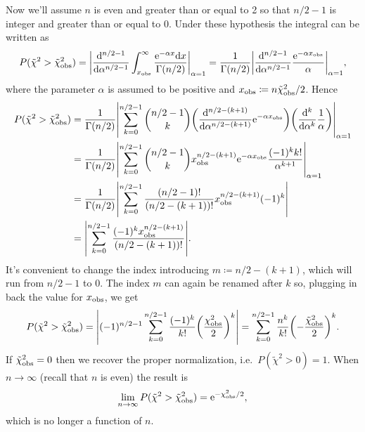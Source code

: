 \documentclass[
	10pt,
	draft
]{scrreprt}
\newcommand{\eu}{\ensuremath{\mathrm{e}}}
\newcommand{\deriv}[3][]{\dfrac{\ud^{#1}#2}{\ud #3^{#1}}}%
\begin{document}
Now we'll assume $n$ is even and greater than or equal to \num{2} so that $n/2-1$ is integer and greater than or equal to \num{0}.
Under these hypothesis the integral can be written as
\begin{equation*}
P(\tilde\chi^2>\tilde\chi^2_\textup{obs})  =
\abs*{\deriv[n/2-1]{}{\alpha}\int_{x_\textup{obs}}^\infty\frac{\eu^{-\alpha x} \!\ud x}{\Gamma(n/2)}}_{\alpha=1}
= \frac{1}{\Gamma(n/2)}\abs*{\deriv[n/2-1]{}{\alpha}\frac{\eu^{-\alpha x_\textup{obs}}}{\alpha}}_{\alpha=1},
\end{equation*}
where the parameter $\alpha$ is assumed to be positive and $x_\textup{obs} \coloneqq n\tilde \chi^2_\textup{obs}/2$.
Hence
\begin{equation*}
\begin{aligned}
P(\tilde\chi^2>\tilde\chi^2_\textup{obs})
&= \frac{1}{\Gamma(n/2)}
\abs*{\sum_{k=0}^{n/2-1}{n/2-1 \choose k}
\tp*{\deriv[n/2-(k+1)]{}{\alpha}\eu^{-\alpha x_\textup{obs}}}
\tp*{\deriv[k]{}{\alpha}\frac{1}{\alpha}}
}_{\alpha=1}\\
&= \frac{1}{\Gamma(n/2)}
\abs*{\sum_{k=0}^{n/2-1}{n/2-1 \choose k}
x_\textup{obs}^{n/2-(k+1)}\eu^{-\alpha x_\textup{obs}}
\frac{(-1)^kk!}{\alpha^{k+1}}
}_{\alpha=1}\\
&= \frac{1}{\Gamma(n/2)}
\abs*{\sum_{k=0}^{n/2-1}\frac{(n/2-1)!}{ (n/2 - (k+1))!}
x_\textup{obs}^{n/2-(k+1)}
(-1)^k
}\\
&=
\abs*{
\sum_{k=0}^{n/2-1}\frac{(-1)^kx_\textup{obs}^{n/2-(k+1)}}{(n/2 - (k+1))!}
}.
\end{aligned}
\end{equation*}
It's convenient to change the index introducing $m\coloneqq n/2-(k+1)$, which will run from $n/2-1$ to $0$.
The index $m$ can again be renamed after $k$ so, plugging in back the value for $x_\textup{obs}$, we get
\begin{equation}
P(\tilde\chi^2>\tilde\chi^2_\textup{obs})
=
\abs*{(-1)^{n/2-1}
\sum_{k=0}^{n/2-1}\frac{(-1)^k}{k!}
\tp*{\frac{\chi^2_\textup{obs}}{2}}^{k}
}
=
\sum_{k=0}^{n/2-1}\frac{n^k}{k!}
\tp*{-\frac{\tilde \chi^2_\textup{obs}}{2}}^{k}.
\end{equation}
If $\tilde\chi^2_\textup{obs} = 0$ then we recover the proper normalization, i.e.~$P(\tilde\chi^2 > 0) = 1$.
When $n\to\infty$ (recall that $n$ is even) the result is
\begin{equation}
\lim_{n\to\infty}P(\tilde\chi^2>\tilde\chi^2_\textup{obs}) = \eu^{-\chi^2_\textup{obs}/2},
\end{equation}
which is no longer a function of $n$.
\end{document}
